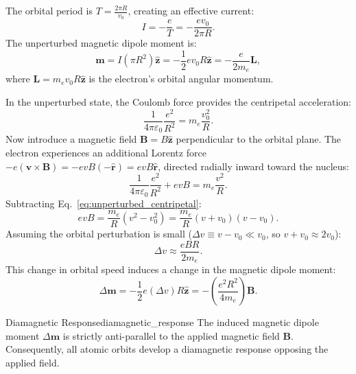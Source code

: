 The orbital period is $T = \frac{2\pi R}{v_0}$, creating an effective current:
\begin{equation}
    I = -\frac{e}{T} = -\frac{ev_0}{2\pi R}.
\end{equation}
The unperturbed magnetic dipole moment is:
\begin{equation}
    \bm{m} = I (\pi R^2)\hat{\bm{z}} = -\frac{1}{2} e v_0 R \hat{\bm{z}} = -\frac{e}{2m_e} \bm{L},
\end{equation}
where $\bm{L} = m_e v_0 R \hat{\bm{z}}$ is the electron's orbital angular momentum.

In the unperturbed state, the Coulomb force provides the centripetal acceleration:
\begin{equation}
    \frac{1}{4\pi\varepsilon_0}\frac{e^2}{R^2} = m_e \frac{v_0^2}{R}.
    \label{eq:unperturbed_centripetal}
\end{equation}
Now introduce a magnetic field $\bm{B} = B \hat{\bm{z}}$ perpendicular to the orbital plane. The electron experiences an additional Lorentz force $-e(\bm{v}\times \bm{B}) = -e v B (-\hat{\bm{r}}) = e v B \hat{\bm{r}}$, directed radially inward toward the nucleus:
\begin{equation}
    \frac{1}{4\pi\varepsilon_0}\frac{e^2}{R^2} + evB = m_e \frac{v^2}{R}.
\end{equation}
Subtracting Eq.~\eqref{eq:unperturbed_centripetal}:
\begin{equation}
    evB = \frac{m_e}{R}(v^2 - v_0^2) = \frac{m_e}{R}(v + v_0)(v - v_0).
\end{equation}
Assuming the orbital perturbation is small ($\Delta v \equiv v - v_0 \ll v_0$, so $v + v_0 \approx 2v_0$):
\begin{equation}
    \Delta v \approx \frac{e B R}{2 m_e}.
\end{equation}
This change in orbital speed induces a change in the magnetic dipole moment:
\begin{equation}
    \Delta \bm{m} = -\frac{1}{2} e (\Delta v) R \hat{\bm{z}} = -\left(\frac{e^2 R^2}{4 m_e}\right) \bm{B}.
    \label{eq:delta_m_diamagnetism}
\end{equation}

\begin{theorem}{Diamagnetic Response}{diamagnetic_response}
    The induced magnetic dipole moment $\Delta \bm{m}$ is strictly anti-parallel to the applied magnetic field $\bm{B}$. Consequently, all atomic orbits develop a diamagnetic response opposing the applied field.
\end{theorem}

